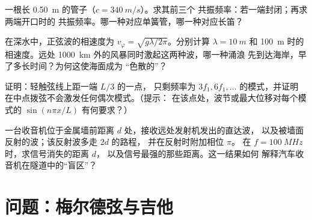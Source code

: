 \begin{exercise}[$\star\star$]\label{exo:b1:wave-propagation:9}
一根长 \qty{0.50}{m} 的管子（$c = \qty{340}{m/s}$）。求其前三个
共振频率：若一端封闭；再求两端开口时的
共振频率。哪一种对应单簧管，哪一种对应长笛？
\end{exercise}

\begin{exercise}[$\star\star\star$]\label{exo:b1:wave-propagation:10}
在深水中，正弦波的相速度为
$v_\varphi = \sqrt{g\lambda/2\pi}$。分别计算 $\lambda = \qty{10}{m}$
和 \qty{100}{m} 时的相速度。远处 \qty{1000}{km} 外的风暴同时激起这两种波，哪一种涌浪
先到达海岸，早了多长时间？为何这使海面成为
“色散的”？
\end{exercise}

\begin{exercise}[$\star\star\star$]\label{exo:b1:wave-propagation:11}
证明：轻触弦线上距一端 $L/3$ 的一点，
只剩频率为 $3f_1, 6f_1, \dots$ 的模式，并证明
在中点拨弦不会激发任何偶次模式。（提示：
在该点处，波节或最大位移对每个模式的
$\sin(n\pi x/L)$ 有何要求？）
\end{exercise}

\begin{exercise}[$\star\star\star$]\label{exo:b1:wave-propagation:12}
一台收音机位于金属墙前距离 $d$ 处，接收远处发射机发出的直达波，
以及被墙面反射的波；该反射波多走 $2d$ 的路程，
并在反射时附加相位 $\pi$。
在 $f = \qty{100}{MHz}$ 时，求信号消失的距离 $d$，
以及信号最强的那些距离。这一结果如何
解释汽车收音机在隧道中的“盲区”？
\end{exercise}

\section{问题：梅尔德弦与吉他}

